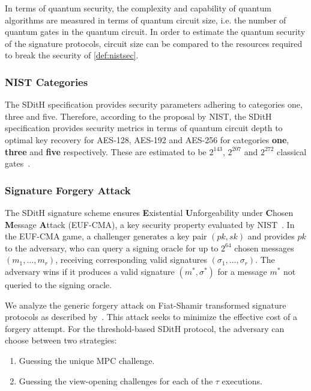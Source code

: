 \documentclass[11pt]{report}
\theoremstyle{definition}
\theoremstyle{plain}
\begin{document}
In terms of quantum security, the complexity and capability of quantum algorithms are measured in terms of quantum circuit size, i.e. the number of quantum gates in the quantum circuit. In order to estimate the quantum security of the signature protocols, circuit size can be compared to the resources required to break the security of \autoref{def:nistsec}.

\subsubsection{NIST Categories}

The SDitH specification provides security parameters adhering to categories one, three and five. Therefore, according to the proposal by NIST, the SDitH specification provides security metrics in terms of quantum circuit depth to optimal key recovery for AES-128, AES-192 and AES-256 for categories \textbf{one}, \textbf{three} and \textbf{five} respectively. These are estimated to be $2^{143}$, $2^{207}$ and $2^{272}$ classical gates~\cite{nistcall}.

\subsubsection{Signature Forgery Attack}

The SDitH signature scheme ensures \textbf{E}xistential \textbf{U}nforgeability under \textbf{C}hosen \textbf{M}essage \textbf{A}ttack (EUF-CMA), a key security property evaluated by NIST~\cite{nistcall,aguilarsyndrome11}. In the EUF-CMA game, a challenger generates a key pair $(pk, sk)$ and provides $pk$ to the adversary, who can query a signing oracle for up to $2^{64}$ chosen messages $(m_1, \dots, m_r)$, receiving corresponding valid signatures $(\sigma_1, \dots, \sigma_r)$. The adversary wins if it produces a valid signature $(m^*, \sigma^*)$ for a message $m^*$ not queried to the signing oracle.

We analyze the generic forgery attack on Fiat-Shamir transformed signature protocols as described by~\cite{kales2020attack}. This attack seeks to minimize the effective cost of a forgery attempt. For the threshold-based SDitH protocol, the adversary can choose between two strategies:
\begin{enumerate}
  \item \label{item:guessing-mpc-challenge} Guessing the unique MPC challenge.
  \item \label{item:guessing-view-challenge} Guessing the view-opening challenges for each of the $\tau$ executions.
\end{enumerate}
\end{document}
